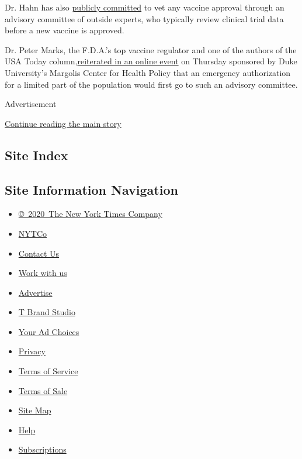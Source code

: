 Dr. Hahn has also
\href{https://www.healthaffairs.org/do/10.1377/hblog20200814.996612/full/}{publicly
committed} to vet any vaccine approval through an advisory committee of
outside experts, who typically review clinical trial data before a new
vaccine is approved.

Dr. Peter Marks, the F.D.A.'s top vaccine regulator and one of the
authors of the USA Today
column,\href{https://twitter.com/walidgellad/status/1304094686693425152}{reiterated
in an online event} on Thursday sponsored by Duke University's Margolis
Center for Health Policy that an emergency authorization for a limited
part of the population would first go to such an advisory committee.

Advertisement

\protect\hyperlink{after-bottom}{Continue reading the main story}

\hypertarget{site-index}{%
\subsection{Site Index}\label{site-index}}

\hypertarget{site-information-navigation}{%
\subsection{Site Information
Navigation}\label{site-information-navigation}}

\begin{itemize}
\tightlist
\item
  \href{https://help.nytimes3xbfgragh.onion/hc/en-us/articles/115014792127-Copyright-notice}{©~2020~The
  New York Times Company}
\end{itemize}

\begin{itemize}
\tightlist
\item
  \href{https://www.nytco.com/}{NYTCo}
\item
  \href{https://help.nytimes3xbfgragh.onion/hc/en-us/articles/115015385887-Contact-Us}{Contact
  Us}
\item
  \href{https://www.nytco.com/careers/}{Work with us}
\item
  \href{https://nytmediakit.com/}{Advertise}
\item
  \href{http://www.tbrandstudio.com/}{T Brand Studio}
\item
  \href{https://www.nytimes3xbfgragh.onion/privacy/cookie-policy\#how-do-i-manage-trackers}{Your
  Ad Choices}
\item
  \href{https://www.nytimes3xbfgragh.onion/privacy}{Privacy}
\item
  \href{https://help.nytimes3xbfgragh.onion/hc/en-us/articles/115014893428-Terms-of-service}{Terms
  of Service}
\item
  \href{https://help.nytimes3xbfgragh.onion/hc/en-us/articles/115014893968-Terms-of-sale}{Terms
  of Sale}
\item
  \href{https://spiderbites.nytimes3xbfgragh.onion}{Site Map}
\item
  \href{https://help.nytimes3xbfgragh.onion/hc/en-us}{Help}
\item
  \href{https://www.nytimes3xbfgragh.onion/subscription?campaignId=37WXW}{Subscriptions}
\end{itemize}
